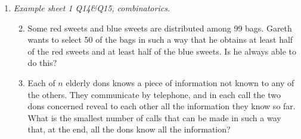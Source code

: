 \documentclass[11pt]{article}
\newlength{\qspace}
\newcounter{qnumber}
\newenvironment{question}%
 {\vspace{\qspace}
  \begin{enumerate}[\bfseries 1\quad][10]%
    \setcounter{enumi}{\value{qnumber}}%
    \item%
 }
{
  \end{enumerate}
  \filbreak
  \stepcounter{qnumber}
 }
\newenvironment{questionparts}[1][1]%
 {
  \begin{enumerate}[\bfseries (i)]%
    \setcounter{enumii}{#1}
    \addtocounter{enumii}{-1}
    \setlength{\parskip}{3pt}
 }
 {
  \end{enumerate}
 }
\begin{document}
\begin{question}\textit{Example sheet 1 Q14\&Q15, combinatorics.}

\begin{questionparts}
    \item Some red sweets and blue sweets are distributed among 99 bags. Gareth wants to select 50 of the bags in such a way that he obtains at least half of the red sweets and at least half of the blue sweets. Is he always able to do this?
    \item Each of $n$ elderly dons knows a piece of information not known to any of the others. They communicate by telephone, and in each call the two dons concerned reveal to each other all the information they know so far. What is the smallest number of calls that can be made in such a way that, at the end, all the dons know all the information?
\end{questionparts}
\end{question}
\end{document}

